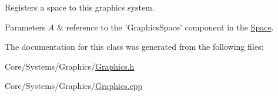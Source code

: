 Registers a space to this graphics system. 


\begin{DoxyParams}{Parameters}
{\em A} & reference to the 'Graphics\-Space' component in the \hyperlink{classDCEngine_1_1Space}{Space}. \\
\hline
\end{DoxyParams}


The documentation for this class was generated from the following files\-:\begin{DoxyCompactItemize}
\item 
Core/\-Systems/\-Graphics/\hyperlink{Graphics_8h}{Graphics.\-h}\item 
Core/\-Systems/\-Graphics/\hyperlink{Graphics_8cpp}{Graphics.\-cpp}\end{DoxyCompactItemize}
